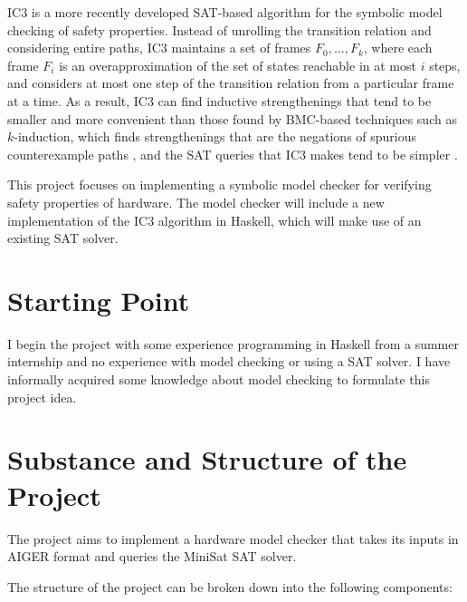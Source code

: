 \documentclass[12pt,a4paper,twoside]{article}
\begin{document}
IC3 \cite{bradley11} is a more recently developed SAT-based algorithm for
the symbolic model checking of safety properties. Instead of unrolling the
transition relation and considering entire paths, IC3 maintains a set of
frames $F_0,...,F_k$, where each frame $F_i$ is an overapproximation of
the set of states reachable in at most $i$ steps, and considers at most one
step of the transition relation from a particular frame at a time.
As a result, IC3 can find inductive strengthenings that tend
to be smaller and more convenient than those found by BMC-based
techniques such as $k$-induction, which finds strengthenings that are the
negations of spurious counterexample paths \cite{demoura03}, and the SAT
queries that IC3 makes tend to be simpler \cite{bradley12}.

This project focuses on implementing a symbolic model checker for verifying
safety properties of hardware. The model checker will include a new
implementation of the IC3 algorithm in Haskell, which will make use of an
existing SAT solver.

\section*{Starting Point}

I begin the project with some experience programming in Haskell
from a summer internship and no experience with model checking or using
a SAT solver. I have informally acquired some knowledge about model checking
to formulate this project idea.

\section*{Substance and Structure of the Project}

The project aims to implement a hardware model checker that takes its
inputs in AIGER format and queries the MiniSat SAT solver.

\noindent The structure of the project can be broken down into the following
components:
\end{document}
